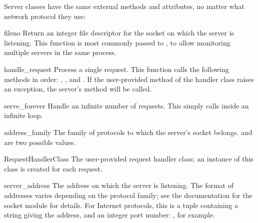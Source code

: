 Server classes have the same external methods and attributes, no
matter what network protocol they use:



\begin{funcdesc}{fileno}{}
Return an integer file descriptor for the socket on which the server
is listening.  This function is most commonly passed to
, to allow monitoring multiple servers in the
same process.
\end{funcdesc}

\begin{funcdesc}{handle_request}{}
Process a single request.  This function calls the following methods
in order: , , and
.  If the user-provided 
method of the handler class raises an exception, the server's
 method will be called.
\end{funcdesc}

\begin{funcdesc}{serve_forever}{}
Handle an infinite number of requests.  This simply calls
 inside an infinite loop.
\end{funcdesc}

\begin{datadesc}{address_family}
The family of protocols to which the server's socket belongs.
 and  are two
possible values.
\end{datadesc}

\begin{datadesc}{RequestHandlerClass}
The user-provided request handler class; an instance of this class is
created for each request.
\end{datadesc}

\begin{datadesc}{server_address}
The address on which the server is listening.  The format of addresses
varies depending on the protocol family; see the documentation for the
socket module for details.  For Internet protocols, this is a tuple
containing a string giving the address, and an integer port number:
, for example.
\end{datadesc}

